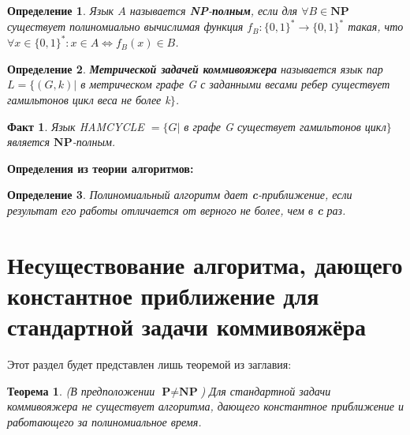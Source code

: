 \documentclass[14pt]{article}
\newtheorem{Def}{Определение}
\newtheorem{Fact}{Факт}
\newtheorem{Th}{Теорема}
\begin{document}
		
		\begin{Def}
			Язык $A$ называется \textbf{NP}-\textbf{полным}, если для $\forall B \in \textbf{NP}$  существует полиномиально вычислимая функция $f_B : \{0, 1\}^* \rightarrow \{0, 1\}^*$ такая, что $\forall x \in \{0, 1\}^* : x \in A \Leftrightarrow f_B(x) \in B$.
		\end{Def}
		
		\begin{Def}
			\textbf{Метрической задачей коммивояжера} называется язык пар $L = \{ (G, k)|$ в метрическом графе G с заданными весами ребер существует гамильтонов цикл веса не более k$\}$.	
		\end{Def}
		
		\begin{Fact}
			Язык HAMCYCLE $= \{ G |$ в графе G существует гамильтонов цикл$\}$ является $\textbf{NP}$-полным.	
		\end{Fact}

		
		\begin{center}
			\textbf{\large Определения из теории алгоритмов:}
		\end{center}
	
		\begin{Def}
			Полиномиальный алгоритм дает \textbf{c}-приближение, если результат его работы отличается от верного не более, чем в \textbf{c} раз.	
		\end{Def}

		
	
	\section{Несуществование алгоритма, дающего константное приближение для стандартной задачи коммивояжёра}
	
	Этот раздел будет представлен лишь теоремой из заглавия:
	
	\begin{Th}
		(В предположении $\textbf{P} \ne \textbf{NP}$) Для стандартной задачи коммивояжера не существует алгоритма, дающего константное приближение и работающего за полиномиальное время.	
	\end{Th}
	
\end{document}
